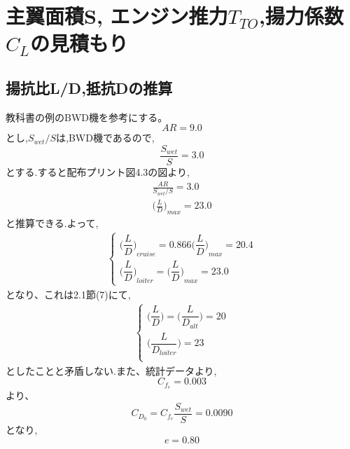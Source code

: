 \documentclass[../main]{subfiles}
\begin{document}
\section{主翼面積S, エンジン推力$T_{TO}$,揚力係数$C_L$の見積もり}
  \subsection{揚抗比L/D,抵抗Dの推算}
    教科書の例のBWD機を参考にする。
    \begin{equation}
      AR = 9.0
    \end{equation}
    とし,$S_{wet}/S$は,BWD機であるので,
    \begin{equation}
      \frac{S_{wet}}{S} = 3.0
    \end{equation}
    とする.すると配布プリント図4.3の図より,
    \begin{align}
      \frac{AR}{S_{wet}/S} = 3.0 \\[5mm]
      { \biggl( \frac{L}{D} \biggr) }_{max} = 23.0
    \end{align}
    と推算できる.よって,
    \begin{eqnarray}
      \begin{cases}
        { \biggl( \dfrac{L}{D} \biggr) }_{cruise} = 0.866 { \biggl( \dfrac{L}{D} \biggr) }_{max}
        = 20.4 \\[5mm]
        { \biggl( \dfrac{L}{D} \biggr) }_{loiter} = { \biggl( \dfrac{L}{D} \biggr) }_{max}
        = 23.0
     \end{cases}
    \end{eqnarray}
    となり、これは2.1節(7)にて,
    \begin{eqnarray}
      \begin{cases}
        \biggl( \dfrac{L}{D} \biggr) = \biggl( \dfrac{L}{D_{alt}} \biggr)
        = 20 \\[5mm]
        \biggl( \dfrac{L}{D_{loiter}} \biggr) = 23 \\
      \end{cases}
    \end{eqnarray}
    としたことと矛盾しない.また、統計データより,
    \begin{equation}
      C_{f_e} = 0.003
    \end{equation}
    より、
    \begin{equation}
      C_{D_0} = C_{f_e} \frac{S_{wet}}{S} = 0.0090
    \end{equation}
    となり,
    \begin{equation}
      e = 0.80
    \end{equation}
\end{document}
